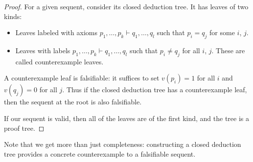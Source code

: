 

\setcounter{section}{2}
\setcounter{subsection}{7}
\setcounter{dfn}{19}

\begin{proof}
For a given sequent, consider its closed deduction tree.
It has leaves of two kinds:
\begin{itemize}
\item
Leaves labeled with axioms $p_1, \ldots, p_k \vdash q_1, \ldots, q_l$ such that $p_i = q_j$ for some $i$, $j$.
\item
Leaves with labels $p_1, \ldots, p_k \vdash q_1, \ldots, q_l$ such that $p_i \ne q_j$ for all $i$, $j$.
These are called counterexample leaves.
\end{itemize}
A counterexample leaf is falsifiable: it suffices to set $v(p_i) = 1$ for all $i$ and $v(q_j) = 0$ for all $j$.
Thus if the closed deduction tree has a counterexample leaf, then the sequent at the root is also falsifiable.

If our sequent is valid, then all of the leaves are of the first kind, and the tree is a proof tree.
\end{proof}

Note that we get more than just completeness: constructing a closed deduction tree provides a concrete counterexample to a falsifiable sequent.




